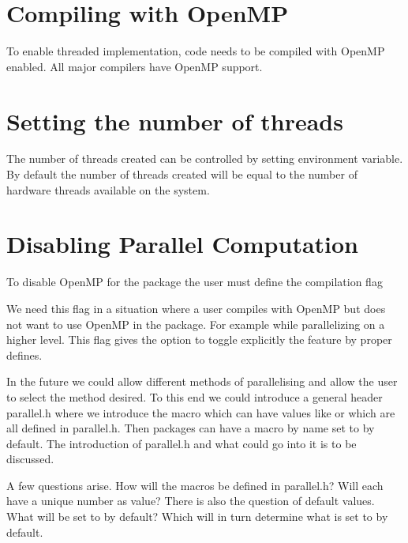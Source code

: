 \section{Compiling with OpenMP\label{sec:compiling_with_openmp}}

To enable threaded implementation, code needs to be compiled with OpenMP enabled. All major compilers have OpenMP support.

\section{Setting the number of threads\label{sec:set_num_thread}}

The number of threads created can be controlled by setting  environment variable. By default the number of threads created will be equal to the number of hardware threads available on the system.

\section{Disabling Parallel Computation\label{sec:disable_parallel}}

To disable OpenMP for the  package the user must define the compilation flag 

We need this flag in a situation where a user compiles with OpenMP but does not want to use OpenMP in the package. For example while parallelizing on a higher level. This flag gives the option to toggle explicitly the feature by proper defines. 

In the future we could allow different methods of parallelising and allow the user to select the method desired. To this end we could introduce a general header parallel.h where we introduce the macro  which can have values like  or  which are all defined in parallel.h. Then packages can have a macro by name  set to  by default.
The introduction of parallel.h and what could go into it is to be discussed.

A few questions arise. How will the  macros be defined in parallel.h? Will each have a unique number as value? There is also the question of default values. What will  be set to by default? Which will in turn determine what  is set to by default.

